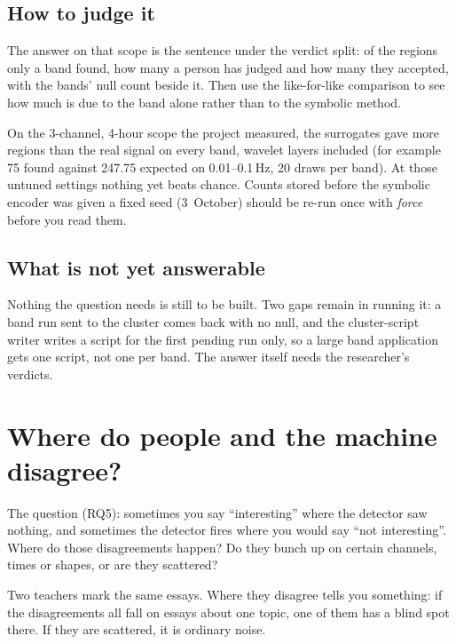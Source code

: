 \subsection*{How to judge it}
The answer on that scope is the sentence under the verdict split: of the regions only a band
found, how many a person has judged and how many they accepted, with the bands' null count
beside it. Then use the like-for-like comparison to see how much is due to the band alone
rather than to the symbolic method.

\begin{watchout}
On the 3-channel, 4-hour scope the project measured, the surrogates gave more regions than
the real signal on every band, wavelet layers included (for example 75 found against 247.75
expected on 0.01--0.1\,Hz, 20 draws per band). At those untuned settings nothing yet beats
chance. Counts stored before the symbolic encoder was given a fixed seed (3~October) should
be re-run once with \emph{force} before you read them.
\end{watchout}

\subsection*{What is not yet answerable}
Nothing the question needs is still to be built. Two gaps remain in running it: a band run
sent to the cluster comes back with no null, and the cluster-script writer writes a script
for the first pending run only, so a large band application gets one script, not one per
band. The answer itself needs the researcher's verdicts.

\section{Where do people and the machine disagree?}\label{sec:workflows-rq5}
The question (RQ5): sometimes you say ``interesting'' where the detector saw nothing, and
sometimes the detector fires where you would say ``not interesting''. Where do those
disagreements happen? Do they bunch up on certain channels, times or shapes, or are they
scattered?

\begin{plainterms}
Two teachers mark the same essays. Where they disagree tells you something: if the
disagreements all fall on essays about one topic, one of them has a blind spot there. If they
are scattered, it is ordinary noise.
\end{plainterms}

